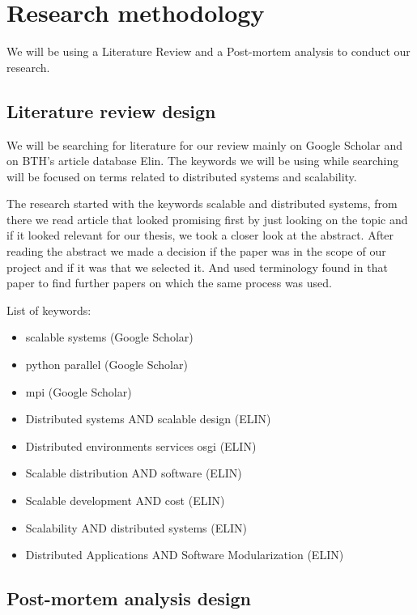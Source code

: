 \documentclass{article}
\begin{document}
{\section{Research methodology}

We will be using a Literature Review and a Post-mortem analysis to conduct our 
research. 

\subsection{Literature review design}

We will be searching for literature for our review mainly on Google Scholar and
on BTH's article database Elin. The keywords we will be using while searching 
will be focused on terms related to distributed systems and scalability.

The research started with the keywords scalable and distributed systems,
from there we read article that looked promising first by just looking on
the topic and if it looked relevant for our thesis, we took a closer look
at the abstract. After reading the abstract we made a decision if the paper
was in the scope of our project and if it was that we selected it. And used
terminology found in that paper to find further papers on which the same 
process was used. 
\newline

List of keywords:
\begin{itemize}
\item{scalable systems (Google Scholar)}
\item{python parallel (Google Scholar)}
\item{mpi (Google Scholar)}
\item{Distributed systems AND scalable design (ELIN)}
\item{Distributed environments services osgi (ELIN)}
\item{Scalable distribution AND software (ELIN)}
\item{Scalable development AND cost (ELIN)}
\item{Scalability AND distributed systems (ELIN)}
\item{Distributed Applications AND Software Modularization (ELIN)}
\end{itemize}

\subsection{Post-mortem analysis design}

}
\end{document}
